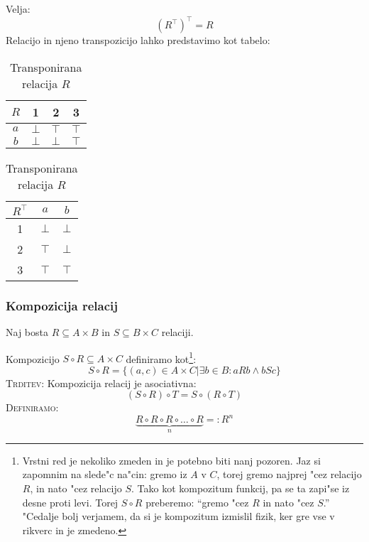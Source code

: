Velja:
\begin{equation*}
(R^\intercal)^\intercal = R
\end{equation*}
Relacijo in njeno transpozicijo lahko predstavimo kot tabelo:
\begin{table}[!htbp]
	\begin{minipage}{.5\linewidth}
		\centering
		\caption{Relacija $R$}
		\begin{tabular}{c|ccc}
			$R$ & 1 & 2 & 3 \\ \hline
			$a$ & $\bot$ & $\top$ & $\top$ \\
			$b$ & $\bot$ & $\bot$ & $\top$
		\end{tabular}
	\end{minipage}%
	\begin{minipage}{.5\linewidth}
		\centering
		\caption{Transponirana relacija $R$}
		\begin{tabular}{c|cc}
			$R^\intercal$ & $a$ & $b$ \\ \hline
			1 & $\bot$ & $\bot$ \\
			2 & $\top$ & $\bot$ \\ 
			3 & $\top$ & $\top$ 
		\end{tabular}
	\end{minipage}
\end{table}

\subsubsection*{Kompozicija relacij}
Naj bosta $R \subseteq A \times B$ in $S \subseteq B \times C$ relaciji.

Kompozicijo $S \circ R \subseteq A \times C$ definiramo kot\footnote{Vrstni red je nekoliko zmeden in je potebno biti nanj pozoren. Jaz si zapomnim na slede"c na"cin: gremo iz $A$ v $C$, torej gremo najprej "cez relacijo $R$, in nato "cez relacijo $S$. Tako kot kompozitum funkcij, pa se ta zapi"se iz desne proti levi. Torej $S \circ R$ preberemo: ``gremo "cez $R$ in nato "cez $S$.'' "Cedalje bolj verjamem, da si je kompozitum izmislil fizik, ker gre vse v rikverc in je zmedeno.}:
\begin{equation*}
S \circ R = \{(a, c) \in A \times C | \exists b \in B: a R b \land b S c\}
\end{equation*}
\textsc{Trditev:} Kompozicija relacij je asociativna:
\begin{equation*}
(S \circ R) \circ T = S \circ (R \circ T)
\end{equation*}
\textsc{Definiramo:}
\begin{equation*}
\underbrace{R \circ R \circ R \circ \ldots \circ R}_n =: R^n
\end{equation*}

